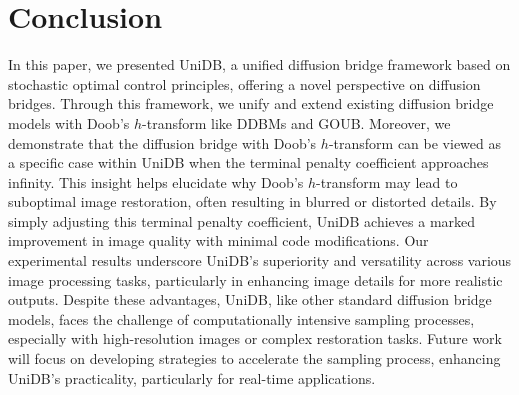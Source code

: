 \section{Conclusion}
In this paper, we presented UniDB, a unified diffusion bridge framework based on stochastic optimal control principles, offering a novel perspective on diffusion bridges. Through this framework, we unify and extend existing diffusion bridge models with Doob's $h$-transform like DDBMs and GOUB. Moreover, we demonstrate that the diffusion bridge with Doob's $h$-transform can be viewed as a specific case within UniDB when the terminal penalty coefficient approaches infinity. This insight helps elucidate why Doob's $h$-transform may lead to suboptimal image restoration, often resulting in blurred or distorted details. By simply adjusting this terminal penalty coefficient, UniDB achieves a marked improvement in image quality with minimal code modifications. Our experimental results underscore UniDB’s superiority and versatility across various image processing tasks, particularly in enhancing image details for more realistic outputs. Despite these advantages, UniDB, like other standard diffusion bridge models, faces the challenge of computationally intensive sampling processes, especially with high-resolution images or complex restoration tasks. Future work will focus on developing strategies to accelerate the sampling process, enhancing UniDB’s practicality, particularly for real-time applications. 
 
